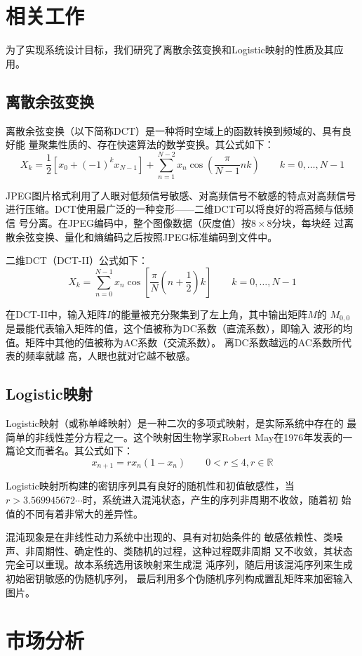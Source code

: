 \section{相关工作}
\label{sec:related-work}
为了实现系统设计目标，我们研究了离散余弦变换和Logistic映射的性质及其应用。

\subsection{离散余弦变换}
离散余弦变换（以下简称DCT）是一种将时空域上的函数转换到频域的、具有良好能
量聚集性质的、存在快速算法的数学变换。其公式如下：
\begin{displaymath}
X_k = \frac1 2 \left[x_0 + \left(-1\right)^k x_{N - 1}\right] + \sum_{n = 1}^{N - 2} x_n \cos \left(
        \frac{\pi} {N - 1} n k \right) \qquad k = 0, \dotsc, N - 1
\end{displaymath}

JPEG图片格式利用了人眼对低频信号敏感、对高频信号不敏感的特点对高频信号
进行压缩。DCT使用最广泛的一种变形——二维DCT可以将良好的将高频与低频信
号分离。在JPEG编码中，整个图像数据（灰度值）按$8 \times 8$分块，每块经
过离散余弦变换、量化和熵编码之后按照JPEG标准编码到文件中。

二维DCT（DCT-II）公式如下：
\begin{displaymath}
X_k = \sum_{n = 0}^{N - 1} x_n \cos \left[\frac{\pi} N \left(n +
        \frac1 2\right) k\right] \qquad k = 0, \dotsc, N - 1
\end{displaymath}

在DCT-II中，输入矩阵$I$的能量被充分聚集到了左上角，其中输出矩阵$M$的
$M_{0, 0}$是最能代表输入矩阵的值，这个值被称为DC系数（直流系数），即输入
波形的均值。矩阵中其他的值被称为AC系数（交流系数）。
离DC系数越远的AC系数所代表的频率就越
高，人眼也就对它越不敏感。



\subsection{Logistic映射}
Logistic映射（或称单峰映射）是一种二次的多项式映射，是实际系统中存在的
最简单的非线性差分方程之一\cite{yang2011}。这个映射因生物学家Robert
May在1976年发表的一篇论文而著名。其公式如下：
\begin{displaymath}
x_{n + 1} = rx_n(1 - x_n) \qquad 0 < r \leq 4, r \in \mathbb{R}
\end{displaymath}

Logistic映射所构建的密钥序列具有良好的随机性和初值敏感性，当$r >
3.569945672\dotsb$时，系统进入混沌状态，产生的序列非周期不收敛，随着初
始值的不同有着非常大的差异性\cite{yang2011}。

混沌现象是在非线性动力系统中出现的、具有对初始条件的
敏感依赖性、类噪声、非周期性、确定性的、类随机的过程，这种过程既非周期
又不收敛，其状态完全可以重现\cite{lu2007}。故本系统选用该映射来生成混
沌序列，随后用该混沌序列来生成初始密钥敏感的伪随机序列，
最后利用多个伪随机序列构成置乱矩阵来加密输入图片。

\section{市场分析}
\label{sec:market-analysis}


